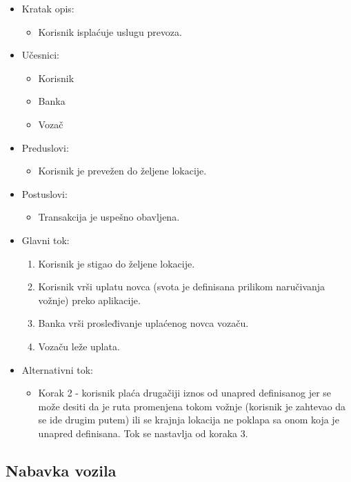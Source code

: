 \begin{itemize}
	\item Kratak opis:
		\begin{itemize}
			\item Korisnik isplaćuje uslugu prevoza.
		\end{itemize}
	\item Učesnici:
		\begin{itemize}
			\item Korisnik
			\item Banka
			\item Vozač
		\end{itemize}				
	\item Preduslovi:
		\begin{itemize}
		    \item Korisnik je prevežen do željene lokacije.
		\end{itemize}
	\item Postuslovi:
		\begin{itemize}
			\item Transakcija je uspešno obavljena.
		\end{itemize}		
	\item Glavni tok:
		\begin{enumerate}
		    \item Korisnik je stigao do željene lokacije.
		    \item Korisnik vrši uplatu novca (svota je definisana prilikom naručivanja vožnje) preko aplikacije.
		    \item Banka vrši prosleđivanje uplaćenog novca vozaču.
		    \item Vozaču leže uplata.
		\end{enumerate}
	\item Alternativni tok:
		\begin{itemize}
    		\item Korak 2 - korisnik plaća drugačiji iznos od unapred definisanog jer se može desiti da je ruta promenjena tokom vožnje (korisnik je zahtevao da se ide drugim putem) ili se krajnja lokacija ne poklapa sa onom koja je unapred definisana. Tok se nastavlja od koraka 3.
		\end{itemize}
\end{itemize}

\newpage

\subsection{\bfseries Nabavka vozila}

